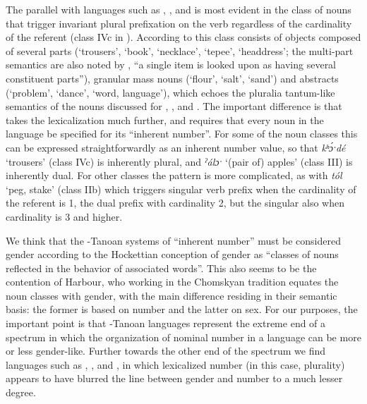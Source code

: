 \documentclass[output=collectionpaper]{langsci/langscibook}
\begin{document}
The parallel with languages such as , ,  and  is most evident in the class of  nouns that trigger invariant plural prefixation on the verb regardless of the cardinality of the referent (class IVc in \citealt{Watkins1984}). According to \cite[46]{Harbour2008} this class consists of objects composed of several parts (`trousers', `book', `necklace', `tepee', `headdress'; the multi-part semantics are also noted by \citealt[270]{Merrifield1959}, ``a single item is looked upon as having several constituent parts''), granular mass nouns (`flour', `salt', `sand') and abstracts (`problem', `dance', `word, language'), which echoes the pluralia tantum-like semantics of the nouns discussed for , ,  and . The important difference is that  takes the lexicalization much further, and requires that every noun in the language be specified for its ``inherent number''. For some of the  noun classes this can be expressed straightforwardly as an inherent number value, so that  \textit{kʰɔ́ˑdé} `trousers' (class IVc) is inherently plural, and \textit{ˀálɔˑ} `(pair of) apples' (class III) is inherently dual. For other classes the pattern is more complicated, as with \textit{tól} `peg, stake' (class IIb) which triggers singular verb prefix when the cardinality of the referent is 1, the dual prefix with cardinality 2, but the singular also when cardinality is 3 and higher.

We think that the -Tanoan systems of ``inherent number'' must be considered gender according to the Hockettian conception of gender as ``classes of nouns reflected in the behavior of associated words''. This also seems to be the contention of Harbour, who \textendash{} working in the Chomskyan tradition \textendash{} equates the  noun classes with  gender, with the main difference residing in their semantic basis: the former is based on number and the latter on sex. For our purposes, the important point is that -Tanoan languages represent the extreme end of a spectrum in which the organization of nominal number in a language can be more or less gender-like. Further towards the other end of the spectrum we find languages such as , ,  and , in which lexicalized number (in this case, plurality) appears to have blurred the line between gender and number to a much lesser degree.
\end{document}
